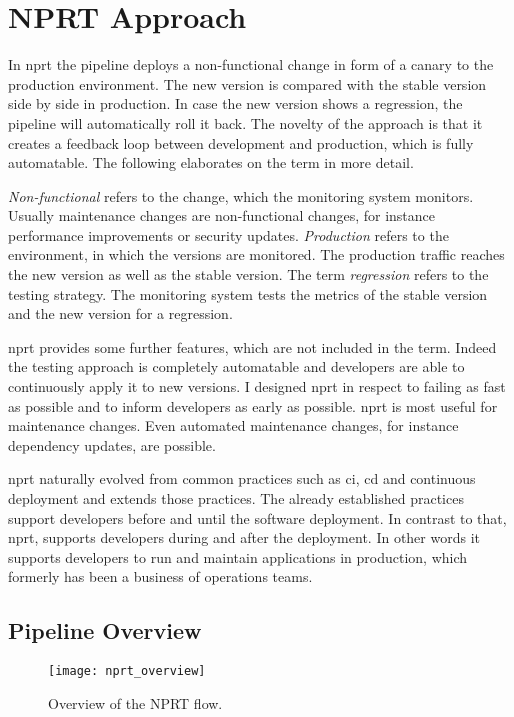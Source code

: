 \chapter{NPRT Approach}
\label{chap:macro}

In \gls{nprt} the pipeline deploys a non-functional change in form of a canary to the
production environment. The new version is compared with the stable version side by side
in production. In case the new version shows a regression, the pipeline will automatically
roll it back. The novelty of the approach is that it creates a feedback loop between
development and production, which is fully automatable. The following elaborates on the
term in more detail.

\emph{Non-functional} refers to the change, which the monitoring system monitors. Usually
maintenance changes are non-functional changes, for instance performance improvements or
security updates. \emph{Production} refers to the environment, in which the versions are
monitored. The production traffic reaches the new version as well as the stable
version. The term \emph{regression} refers to the testing strategy. The monitoring system
tests the metrics of the stable version and the new version for a regression.

\gls{nprt} provides some further features, which are not included in the term. Indeed the
testing approach is completely automatable and developers are able to continuously apply
it to new versions. I designed \gls{nprt} in respect to failing as fast as possible and to
inform developers as early as possible. \gls{nprt} is most useful for maintenance
changes. Even automated maintenance changes, for instance dependency updates, are
possible.

\gls{nprt} naturally evolved from common practices such as \gls{ci}, \gls{cd} and
continuous deployment and extends those practices. The already established practices
support developers before and until the software deployment. In contrast to that,
\gls{nprt}, supports developers during and after the deployment. In other words it
supports developers to run and maintain applications in production, which formerly has
been a business of operations teams.

\section{Pipeline Overview}

\begin{figure}[htbp]
  \texttt{[image: nprt\_overview]}
  \caption[nprtflow]{Overview of the NPRT flow.}
  \label{fig:nprt_flow}
\end{figure}

